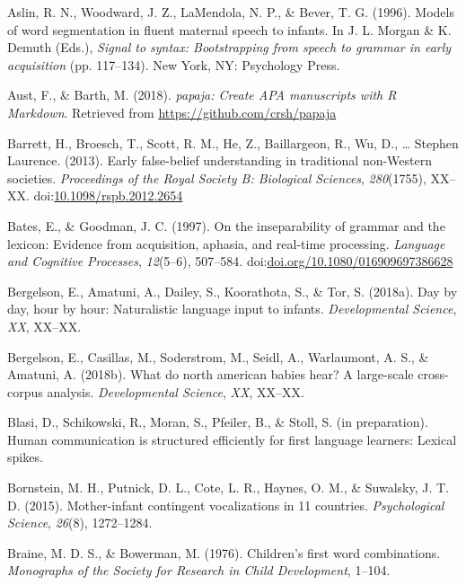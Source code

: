 \documentclass[floatsintext,man]{apa6}
\theoremstyle{definition}
\theoremstyle{definition}
\theoremstyle{definition}
\theoremstyle{remark}
\begin{document}
\hypertarget{ref-aslin1996models}{}
Aslin, R. N., Woodward, J. Z., LaMendola, N. P., \& Bever, T. G. (1996).
Models of word segmentation in fluent maternal speech to infants. In J.
L. Morgan \& K. Demuth (Eds.), \emph{Signal to syntax: Bootstrapping
from speech to grammar in early acquisition} (pp. 117--134). New York,
NY: Psychology Press.

\hypertarget{ref-R-papaja}{}
Aust, F., \& Barth, M. (2018). \emph{papaja: Create APA manuscripts with
R Markdown}. Retrieved from \url{https://github.com/crsh/papaja}

\hypertarget{ref-barrett2013early}{}
Barrett, H., Broesch, T., Scott, R. M., He, Z., Baillargeon, R., Wu, D.,
\ldots{} Stephen Laurence. (2013). Early false-belief understanding in
traditional non-Western societies. \emph{Proceedings of the Royal
Society B: Biological Sciences}, \emph{280}(1755), XX--XX.
doi:\href{https://doi.org/10.1098/rspb.2012.2654}{10.1098/rspb.2012.2654}

\hypertarget{ref-bates1997inseparability}{}
Bates, E., \& Goodman, J. C. (1997). On the inseparability of grammar
and the lexicon: Evidence from acquisition, aphasia, and real-time
processing. \emph{Language and Cognitive Processes}, \emph{12}(5--6),
507--584.
doi:\href{https://doi.org/doi.org/10.1080/016909697386628}{doi.org/10.1080/016909697386628}

\hypertarget{ref-bergelson2018day}{}
Bergelson, E., Amatuni, A., Dailey, S., Koorathota, S., \& Tor, S.
(2018a). Day by day, hour by hour: Naturalistic language input to
infants. \emph{Developmental Science}, \emph{XX}, XX--XX.

\hypertarget{ref-bergelsoncasillas2018what}{}
Bergelson, E., Casillas, M., Soderstrom, M., Seidl, A., Warlaumont, A.
S., \& Amatuni, A. (2018b). What do north american babies hear? A
large-scale cross-corpus analysis. \emph{Developmental Science},
\emph{XX}, XX--XX.

\hypertarget{ref-blasiIPhuman}{}
Blasi, D., Schikowski, R., Moran, S., Pfeiler, B., \& Stoll, S. (in
preparation). Human communication is structured efficiently for first
language learners: Lexical spikes.

\hypertarget{ref-bornstein2015mother}{}
Bornstein, M. H., Putnick, D. L., Cote, L. R., Haynes, O. M., \&
Suwalsky, J. T. D. (2015). Mother-infant contingent vocalizations in 11
countries. \emph{Psychological Science}, \emph{26}(8), 1272--1284.

\hypertarget{ref-braine1976childrens}{}
Braine, M. D. S., \& Bowerman, M. (1976). Children's first word
combinations. \emph{Monographs of the Society for Research in Child
Development}, 1--104.
\end{document}
